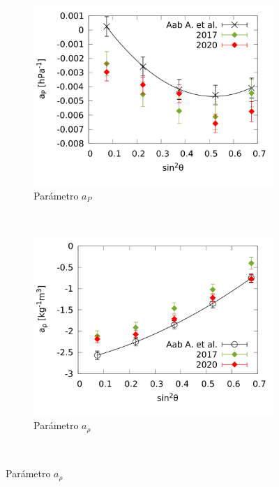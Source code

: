        \begin{figure}[H]
          \begin{subfigure}[b]{0.5\textwidth}
          \includegraphics[width=\linewidth]{../03_IntroduccionReport/params/ap_2017_2020_above_1EeV.png}
          \caption{Parámetro $a_P$ }
          \end{subfigure}\\
          \begin{subfigure}[b]{0.5\textwidth}
          \includegraphics[width=\linewidth]{../03_IntroduccionReport/params/arho_2017_2020_above_1EeV.png}
          \caption{Parámetro $a_{\rho}$ }
          \end{subfigure}\\

\end{figure}
